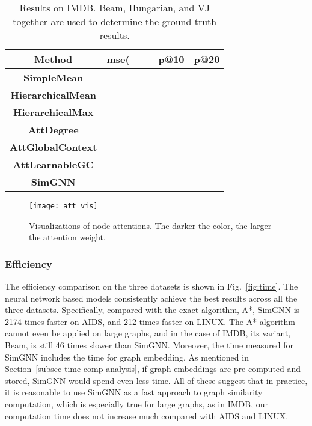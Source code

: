 \documentclass[sigconf]{acmart}
\begin{document}
\begin{table}
\footnotesize
\centering
\vspace{-0.05in}
\caption{Results on IMDB. Beam, Hungarian, and VJ together are used to determine the ground-truth results.}
\vspace{-0.05in}
\begin{tabular}{|c|ccccc|} \hline
\textbf{Method} & \textbf{mse(} & \textbf{} & \textbf{}  & \textbf{p@10} & \textbf{p@20} \\ \hline\hline
\textbf{SimpleMean} &  &  &  &  &   \\
\textbf{HierarchicalMean} &  &  &  &  &   \\
\textbf{HierarchicalMax} &  & &  &  &   \\
\textbf{AttDegree} &  &  &   &  &  \\
\textbf{AttGlobalContext} &  &  &  &  &  \\
\textbf{AttLearnableGC} &  &  &  &  &  \\ \hline\hline
\textbf{SimGNN} &  &   &  &  &  \\ \hline
\end{tabular}
\centering
\label{imdb_results}
\end{table}



\begin{figure}
    \centering
    {{\texttt{[image: att\_vis]} }}
    \vspace{-0.1in}
    \caption{Visualizations of node attentions. The darker the color, the larger the attention weight.}
    \vspace{-0.1in}
    \label{fig:att_vis}
\end{figure}
\subsubsection{Efficiency}
\label{subsec-efficiency}
The efficiency comparison on the three datasets is shown in Fig.~\ref{fig:time}. The neural network based models consistently achieve the best results across all the three datasets. Specifically, compared with the exact algorithm, A*, SimGNN is 2174 times faster on AIDS, and 212 times faster on LINUX. The A* algorithm cannot even be applied on large graphs, and in the case of IMDB, its variant, Beam, is still 46 times slower than SimGNN. Moreover, the time measured for SimGNN includes the time for graph embedding. As mentioned in Section~\ref{subsec-time-comp-analysis}, if graph embeddings are pre-computed and stored, SimGNN would spend even less time. All of these suggest that in practice, it is reasonable to use SimGNN as a fast approach to graph similarity computation, which is especially true for large graphs, as in IMDB, our computation time does not increase much compared with AIDS and LINUX.
\end{document}
